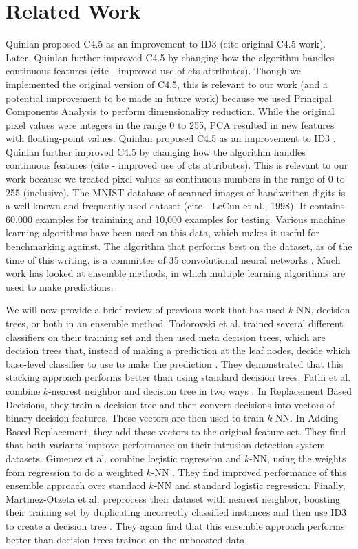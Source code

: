 \section{Related Work}
Quinlan proposed C4.5 as an improvement to ID3 (cite original C4.5 work). Later, Quinlan further improved C4.5 by changing how the algorithm handles continuous features (cite - improved use of cts attributes). Though we implemented the original version of C4.5, this is relevant to our work (and a potential improvement to be made in future work) because we used Principal Components Analysis to perform dimensionality reduction.  While the original pixel values were integers in the range 0 to 255, PCA resulted in new features with floating-point values.
Quinlan proposed C4.5 as an improvement to ID3 \cite{quinlan2014c4}. Quinlan further improved C4.5 by changing how the algorithm handles continuous features (cite - improved use of cts attributes). This is relevant to our work because we treated pixel values as continuous numbers in the range of 0 to 255 (inclusive). 
The MNIST database of scanned images of handwritten digits is a well-known and frequently used dataset (cite - LeCun et al., 1998). It contains 60,000 examples for trainining and 10,000 examples for testing. Various machine learning algorithms have been used on this data, which makes it useful for benchmarking against. The algorithm that performs best on the dataset, as of the time of this writing, is a committee of 35 convolutional neural networks \cite{cirecsan2010deep}.
Much work has looked at ensemble methods, in which multiple learning algorithms are used to make predictions. 

We will now provide a brief review of previous work that has used $k$-NN, decision trees, or both in an ensemble method. Todorovski et al. trained several different classifiers on their training set and then used meta decision trees, which are decision trees that, instead of making a prediction at the leaf nodes, decide which base-level classifier to use to make the prediction \cite{todorovski2003combining}. They demonstrated that this stacking approach performs better than using standard decision trees.
Fathi et al. combine $k$-nearest neighbor and decision tree in two ways \cite{FathiMazinani}. In Replacement Based Decisions, they train a decision tree and then convert decisions into vectors of binary decision-features. These vectors are then used to train $k$-NN. In Adding Based Replacement, they add these vectors to the original feature set. They find that both variants improve performance on their intrusion detection system datasets.
Gimenez et al. combine logistic rogression and $k$-NN, using the weights from regression to do a weighted $k$-NN \cite{campillo2013improving}. They find improved performance of this ensemble approach over standard $k$-NN and standard logistic regression. Finally, Martinez-Otzeta et al. preprocess their dataset with nearest neighbor, boosting their training set by duplicating incorrectly classified instances and then use ID3 to create a decision tree \cite{martinezk}. They again find that this ensemble approach performs better than decision trees trained on the unboosted data. 

